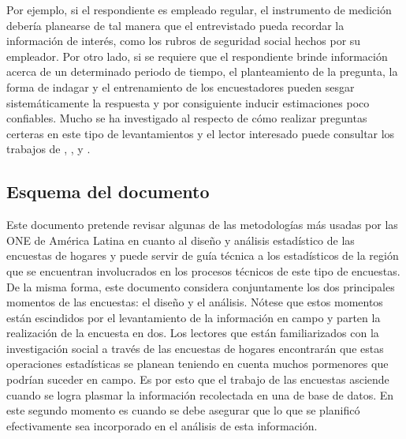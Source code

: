 \documentclass[
  12pt,
  spanish,
]{book}
\begin{document}
Por ejemplo, si el respondiente es empleado regular, el instrumento de medición debería planearse de tal manera que el entrevistado pueda recordar la información de interés, como los rubros de seguridad social hechos por su empleador. Por otro lado, si se requiere que el respondiente brinde información acerca de un determinado periodo de tiempo, el planteamiento de la pregunta, la forma de indagar y el entrenamiento de los encuestadores pueden sesgar sistemáticamente la respuesta y por consiguiente inducir estimaciones poco confiables. Mucho se ha investigado al respecto de cómo realizar preguntas certeras en este tipo de levantamientos y el lector interesado puede consultar los trabajos de \citet{Biemer_Lyberg_2003}, \citet{Presser_Rothgeb_Couper_Lessler_Martin_Martin_Singer_2004}, y \citet{Groves_Fowler_Couper_Lepkowski_Singer_Tourangeau_2009}.

\hypertarget{esquema-del-documento}{%
\subsection*{Esquema del documento}\label{esquema-del-documento}}

Este documento pretende revisar algunas de las metodologías más usadas por las ONE de América Latina en cuanto al diseño y análisis estadístico de las encuestas de hogares y puede servir de guía técnica a los estadísticos de la región que se encuentran involucrados en los procesos técnicos de este tipo de encuestas. De la misma forma, este documento considera conjuntamente los dos principales momentos de las encuestas: el diseño y el análisis. Nótese que estos momentos están escindidos por el levantamiento de la información en campo y parten la realización de la encuesta en dos. Los lectores que están familiarizados con la investigación social a través de las encuestas de hogares encontrarán que estas operaciones estadísticas se planean teniendo en cuenta muchos pormenores que podrían suceder en campo. Es por esto que el trabajo de las encuestas asciende cuando se logra plasmar la información recolectada en una de base de datos. En este segundo momento es cuando se debe asegurar que lo que se planificó efectivamente sea incorporado en el análisis de esta información.
\end{document}

